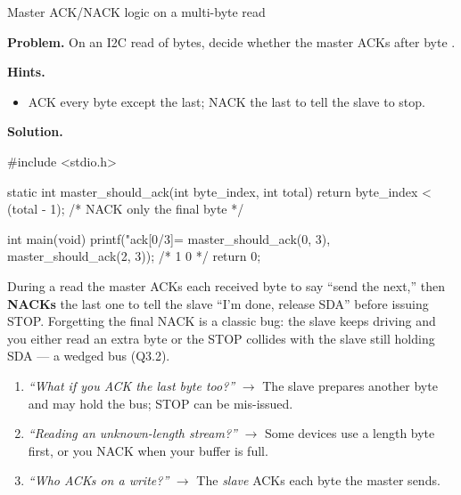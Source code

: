 \begin{gymproblem}{Master ACK/NACK logic on a multi-byte read}

\textbf{Problem.} On an I2C read of  bytes, decide whether the
master ACKs after byte .

\textbf{Hints.}
\begin{itemize}
\item ACK every byte except the last; NACK the last to tell the slave to stop.
\end{itemize}

\attempt

\textbf{Solution.}
\begin{cgym}
#include <stdio.h>

static int master_should_ack(int byte_index, int total) {
    return byte_index < (total - 1);     /* NACK only the final byte */
}

int main(void) {
    printf("ack[0/3]=%
           master_should_ack(0, 3), master_should_ack(2, 3));   /* 1 0 */
    return 0;
}
\end{cgym}

During a read the master ACKs each received byte to say ``send the next,'' then
\textbf{NACKs} the last one to tell the slave ``I'm done, release SDA'' before
issuing STOP. Forgetting the final NACK is a classic bug: the slave keeps
driving and you either read an extra byte or the STOP collides with the slave
still holding SDA --- a wedged bus (Q3.2).

\followups
\begin{enumerate}
\item \emph{``What if you ACK the last byte too?''} $\rightarrow$ The slave
  prepares another byte and may hold the bus; STOP can be mis-issued.
\item \emph{``Reading an unknown-length stream?''} $\rightarrow$ Some devices
  use a length byte first, or you NACK when your buffer is full.
\item \emph{``Who ACKs on a write?''} $\rightarrow$ The \emph{slave} ACKs each
  byte the master sends.
\end{enumerate}
\end{gymproblem}


